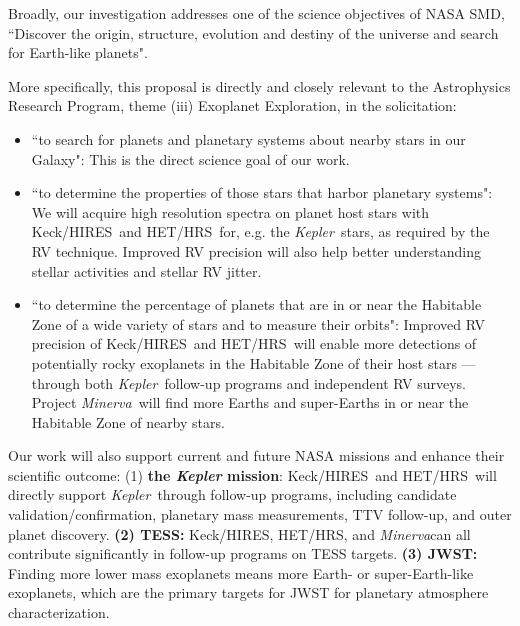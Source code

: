 \documentclass[12pt]{article}
\def\kepler{{\it Kepler}}
\def\minerva{{\it Minerva}}
\def\hrs{HET/HRS}
\def\keck{Keck/HIRES}
\begin{document}
Broadly, our investigation addresses one of the science
objectives of NASA SMD, ``Discover the origin, structure, evolution
and destiny of the universe and search for Earth-like planets".

More specifically, this proposal is directly and closely relevant to
the Astrophysics Research Program, theme (iii) Exoplanet Exploration,
in the solicitation:
\begin{itemize}[leftmargin=1.5em]
  \vspace{-3pt}
\item ``to search for planets and planetary systems about
  nearby stars in our Galaxy": This is the direct science goal of our
  work. 
  \vspace{-3pt}
\item ``to determine the properties of those stars that harbor
  planetary systems": We will acquire high resolution spectra on
  planet host stars with \keck\ and \hrs\ for, e.g. the
  \kepler\ stars, as required by the RV technique. Improved RV
  precision will also help better understanding stellar activities and
  stellar RV jitter.
  \vspace{-3pt}
\item ``to determine the percentage of planets that are in or near the
  Habitable Zone of a wide variety of stars and to measure their
  orbits": Improved RV precision of \keck\ and \hrs\ will enable more
  detections of potentially rocky exoplanets in the Habitable Zone of
  their host stars --- through both \kepler\ follow-up programs and
  independent RV surveys. Project \minerva\ will find more Earths and
  super-Earths in or near the Habitable Zone of nearby stars.
  \vspace{-3pt}
\end{itemize}

Our work will also support current and future NASA missions and
enhance their scientific outcome: (1) {\bf the \textit{Kepler}
  mission}: \keck\ and \hrs\ will directly support \kepler\ through
follow-up programs, including candidate validation/confirmation,
planetary mass measurements, TTV follow-up, and outer planet
discovery. {\bf (2) TESS:} \keck, \hrs, and \minerva can all
contribute significantly in follow-up programs on TESS targets. {\bf
  (3) JWST:} Finding more lower mass exoplanets means more Earth- or
super-Earth-like exoplanets, which are the primary targets for JWST
for planetary atmosphere characterization.


\vspace{-3pt}
\end{document}
